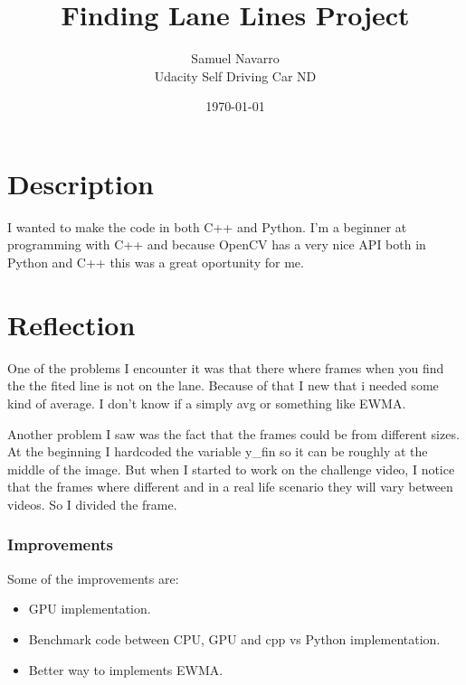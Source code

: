 \documentclass[11pt, a4paper]{article}
\begin{document}
\title{Finding Lane Lines Project}
\author{Samuel Navarro \\ Udacity Self Driving Car ND}
\date{\today}
\maketitle
	
	\section{Description}%
	\label{sec:description}

	I wanted to make the code in both C++ and Python. I'm a beginner at programming with C++ and because OpenCV has a very nice API both in Python and C++ this was a great oportunity for me.



	\section{Reflection}%
	\label{sec:problems}
	
	One of the problems I encounter it was that there where frames when you find the the fited line is not on the lane. Because of that I new that i needed some kind of average. I don't know if a simply avg or something like EWMA.


	Another problem I saw was the fact that the frames could be from different sizes. At the beginning I hardcoded the variable y\_fin so it can be roughly at the middle of the image. But when I started to work on the challenge video, I notice that the frames where different and in a real life scenario they will vary between videos. So I divided the frame.


	\subsubsection{Improvements}%
	\label{ssub:improvements}
	
		
	Some of the improvements are:
	\begin{itemize}
		\item GPU implementation.
		\item Benchmark code between CPU, GPU and cpp vs Python implementation.
		\item Better way to implements EWMA.
	\end{itemize}
	
\end{document}
